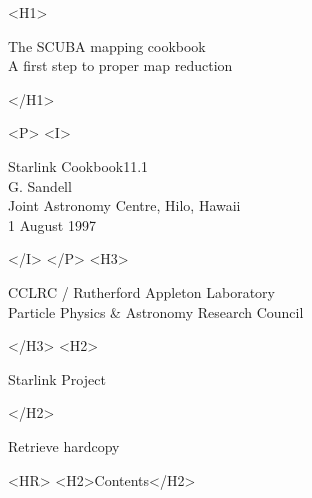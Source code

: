 \documentclass[twoside,11pt]{article}
\newcommand{\stardoccategory}  {Starlink Cookbook}
\newcommand{\stardocsource}    {sc\stardocnumber}
\newcommand{\stardocnumber}    {11.1}
\newcommand{\stardocauthors}   {G. Sandell \\ \jac}
\newcommand{\stardocdate}      {1 August 1997}
\newcommand{\stardoctitle}     {The SCUBA mapping cookbook\\[2ex]
                                A first step to proper map reduction}
\newcommand{\stardocversion}   {\ }
\newcommand{\stardocmanual}    {\ }
\newcommand{\jac}{\htmladdnormallink{Joint Astronomy Centre}{http://www.jach.hawaii.edu},
 Hilo, Hawaii}
\newcommand{\htmladdnormallink}[2]{#1}
\newcommand{\htmladdimg}[1]{}
\newcommand{\htmlref}[2]{#1}
\newcommand{\htmladdtonavigation}[1]{}
\newcommand{\xlabel}[1]{}
\newcommand{\latexonlytoc}[0]{\tableofcontents}
\begin{document}
\begin{htmlonly}
   \xlabel{}
   \begin{rawhtml} <H1> \end{rawhtml}
      \stardoctitle\\
   \begin{rawhtml} </H1> \end{rawhtml}
 
 
   \begin{rawhtml} <P> <I> \end{rawhtml}
   \stardoccategory \stardocnumber \\
   \stardocauthors \\
   \stardocdate
   \begin{rawhtml} </I> </P> <H3> \end{rawhtml}
      \htmladdnormallink{CCLRC}{http://www.cclrc.ac.uk} /
      \htmladdnormallink{Rutherford Appleton Laboratory}
                        {http://www.cclrc.ac.uk/ral} \\
      \htmladdnormallink{Particle Physics \& Astronomy Research Council}
                        {http://www.pparc.ac.uk} \\
   \begin{rawhtml} </H3> <H2> \end{rawhtml}
      \htmladdnormallink{Starlink Project}{http://star-www.rl.ac.uk/}
   \begin{rawhtml} </H2> \end{rawhtml}
   \htmladdnormallink{\htmladdimg{source.gif} Retrieve hardcopy}
      {http://star-www.rl.ac.uk/cgi-bin/hcserver?\stardocsource}\\
 
  \label{stardoccontents}
  \begin{rawhtml} 
    <HR>
    <H2>Contents</H2>
  \end{rawhtml}
  \renewcommand{\latexonlytoc}[0]{}
  \htmladdtonavigation{\htmlref{\htmladdimg{contents_motif.gif}}
        {stardoccontents}}
 
\end{htmlonly}
 
\end{document}
